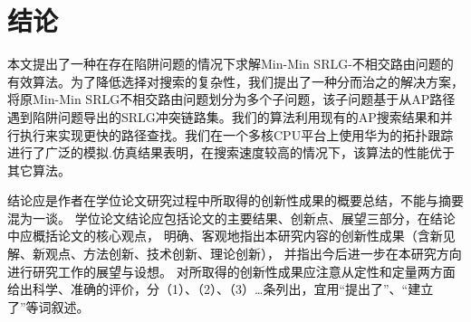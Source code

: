 
\chapter*{结\quad 论}
本文提出了一种在存在陷阱问题的情况下求解Min-Min SRLG-不相交路由问题的有效算法。为了降低选择对搜索的复杂性，我们提出了一种分而治之的解决方案，将原Min-Min SRLG不相交路由问题划分为多个子问题，该子问题基于从AP路径遇到陷阱问题导出的SRLG冲突链路集。我们的算法利用现有的AP搜索结果和并行执行来实现更快的路径查找。我们在一个多核CPU平台上使用华为的拓扑跟踪进行了广泛的模拟.仿真结果表明，在搜索速度较高的情况下，该算法的性能优于其它算法。


结论应是作者在学位论文研究过程中所取得的创新性成果的概要总结，不能与摘要混为一谈。
学位论文结论应包括论文的主要结果、创新点、展望三部分，在结论中应概括论文的核心观点，
明确、客观地指出本研究内容的创新性成果（含新见解、新观点、方法创新、技术创新、理论创新），
并指出今后进一步在本研究方向进行研究工作的展望与设想。
对所取得的创新性成果应注意从定性和定量两方面给出科学、准确的评价，分（1）、（2）、（3）…条列出，宜用“提出了”、“建立了”等词叙述。



